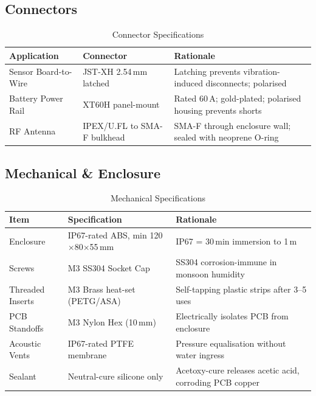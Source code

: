 \documentclass[12pt,a4paper]{article}
\begin{document}
\subsection{Connectors}

\begin{table}[h!]
\centering
\caption{Connector Specifications}
\begin{tabular}{L{3cm} L{4cm} L{6.5cm}}
\toprule
\textbf{Application} & \textbf{Connector} & \textbf{Rationale} \\
\midrule
Sensor Board-to-Wire & JST-XH 2.54\,mm latched & Latching prevents vibration-induced disconnects; polarised \\
Battery Power Rail & XT60H panel-mount & Rated 60\,A; gold-plated; polarised housing prevents shorts \\
RF Antenna & IPEX/U.FL to SMA-F bulkhead & SMA-F through enclosure wall; sealed with neoprene O-ring \\
\bottomrule
\end{tabular}
\end{table}

\subsection{Mechanical \& Enclosure}

\begin{table}[h!]
\centering
\caption{Mechanical Specifications}
\begin{tabular}{L{3.5cm} L{5cm} L{5cm}}
\toprule
\textbf{Item} & \textbf{Specification} & \textbf{Rationale} \\
\midrule
Enclosure & IP67-rated ABS, min 120$\times$80$\times$55\,mm & IP67 = 30\,min immersion to 1\,m \\
Screws & M3 SS304 Socket Cap & SS304 corrosion-immune in monsoon humidity \\
Threaded Inserts & M3 Brass heat-set (PETG/ASA) & Self-tapping plastic strips after 3--5 uses \\
PCB Standoffs & M3 Nylon Hex (10\,mm) & Electrically isolates PCB from enclosure \\
Acoustic Vents & IP67-rated PTFE membrane & Pressure equalisation without water ingress \\
Sealant & Neutral-cure silicone only & Acetoxy-cure releases acetic acid, corroding PCB copper \\
\bottomrule
\end{tabular}
\end{table}
\end{document}
